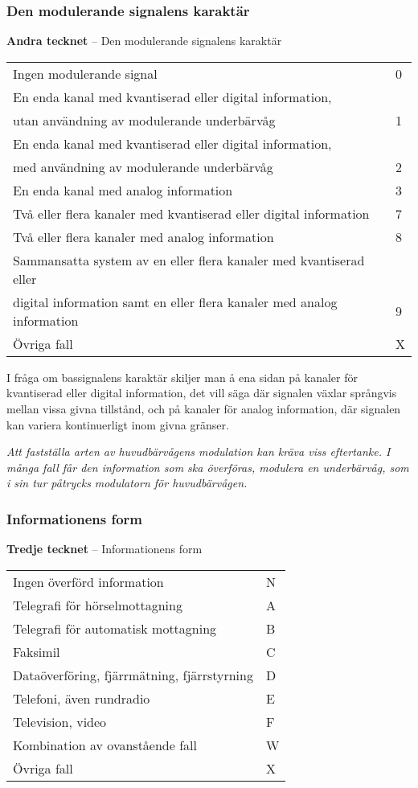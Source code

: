 \subsubsection{Den modulerande signalens karaktär}
\textbf{Andra tecknet} -- Den modulerande signalens karaktär\\
\begin{tabular}{ll}
	Ingen modulerande signal & 0\\
	En enda kanal med kvantiserad eller digital information, &\\
	utan användning av modulerande underbärvåg & 1\\
	En enda kanal med kvantiserad eller digital information, &\\
	med användning av modulerande underbärvåg & 2\\
	En enda kanal med analog information & 3\\
	Två eller flera kanaler med kvantiserad eller digital information & 7\\
	Två eller flera kanaler med analog information & 8\\
	Sammansatta system av en eller flera kanaler med kvantiserad eller & \\
	digital information samt en eller flera kanaler med analog information & 9\\
	Övriga fall & X\\
\end{tabular}

I fråga om bassignalens karaktär skiljer man å ena sidan på kanaler för
kvantiserad eller digital information, det vill säga där signalen växlar
språngvis mellan vissa givna tillstånd, och på kanaler för analog information,
där signalen kan variera kontinuerligt inom givna gränser.

\emph{Att fastställa arten av huvudbärvågens modulation kan kräva viss
  eftertanke.
  I många fall får den information som ska överföras, modulera en underbärvåg,
  som i sin tur påtrycks modulatorn för huvudbärvågen.}

\subsubsection{Informationens form}
\textbf{Tredje tecknet} -- Informationens form\\
\begin{tabular}{ll}
	Ingen överförd information & N\\
	Telegrafi för hörselmottagning & A\\
	Telegrafi för automatisk mottagning & B\\
	Faksimil & C\\
	Dataöverföring, fjärrmätning, fjärrstyrning & D\\
	Telefoni, även rundradio & E\\
	Television, video & F\\
	Kombination av ovanstående fall & W\\
	Övriga fall & X\\
\end{tabular}

